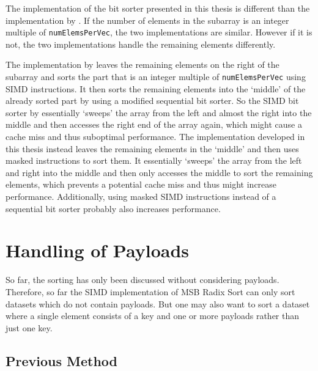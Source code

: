 \documentclass[12pt, a4paper, openright, twoside]{tiarbeit}
\begin{document}
The implementation of the bit sorter
presented in this thesis is different
than the implementation by \citet{moeller_radix}.
If the number of elements in the subarray is an integer multiple of
\texttt{numElemsPerVec}, the two implementations are similar.
However if it is not, the two implementations handle the remaining elements
differently.

The implementation by \citet{moeller_radix} leaves the remaining elements
on the right of the subarray and sorts the part that is an integer multiple of
\texttt{numElemsPerVec} using SIMD instructions. It then sorts the remaining
elements into the `middle' of the already sorted part by using
a modified sequential bit sorter. So the SIMD bit sorter by \citet{moeller_radix}
essentially `sweeps' the array from the left and almost the right into
the middle and then accesses the right end of the array again, which might
cause a cache miss and thus suboptimal performance.
The implementation developed in this thesis instead leaves the remaining
elements in the `middle' and then uses masked instructions to sort them.
It essentially `sweeps' the array from the left and right into the middle
and then only accesses the middle to sort the remaining elements,
which prevents a potential cache miss and thus might increase performance.
Additionally, using masked SIMD instructions instead of a sequential bit sorter
probably also increases performance.

\section{Handling of Payloads}

So far, the sorting has only been discussed without considering payloads.
Therefore, so far the SIMD implementation of MSB Radix Sort can only sort
datasets which do not contain payloads.
But one may also want to sort a dataset where a single element consists of
a key and one or more payloads rather than just one key.

\subsection{Previous Method}
\label{sec:payload_handling_previous_method}

%  
\end{document}
